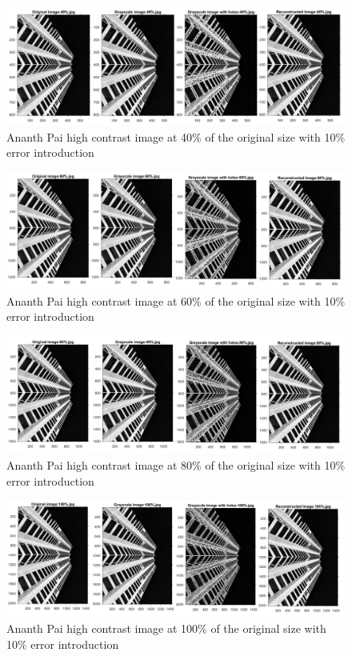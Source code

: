 \begin{figure}[!ht]
\center \includegraphics[scale=0.3]{AnanthPai40.jpg}
\caption{Ananth Pai high contrast image at 40\% of the original size with 10\% error introduction}
\label{fig:AnanthPai40}
\end{figure}

\begin{figure}[!ht]
\center \includegraphics[scale=0.3]{AnanthPai60.jpg}
\caption{Ananth Pai high contrast image at 60\% of the original size with 10\% error introduction}
\label{fig:AnanthPai60}
\end{figure}

\begin{figure}[!ht]
\center \includegraphics[scale=0.3]{AnanthPai80.jpg}
\caption{Ananth Pai high contrast image at 80\% of the original size with 10\% error introduction}
\label{fig:AnanthPai80}
\end{figure}

\begin{figure}[!ht]
\center \includegraphics[scale=0.3]{AnanthPai100.jpg}
\caption{Ananth Pai high contrast image at 100\% of the original size with 10\% error introduction}
\label{fig:AnanthPai100}
\end{figure}

